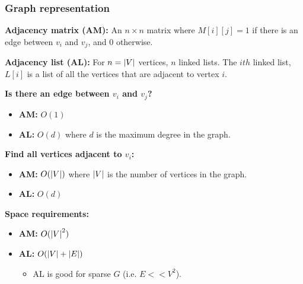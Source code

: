     \subsubsection{Graph representation}
    \begin{definition}
        
        \textbf{Adjacency matrix (AM):} An $n\times n$ matrix where $M[i][j]=1$ if there is an edge between $v_i$ and $v_j$, and $0$ otherwise.
        \vspace{1em}

        \textbf{Adjacency list (AL):} For $n=\abs{V}$ vertices, $n$ linked lists. The $ith$ linked list, $L[i]$ is a list of all the vertices that are adjacent to vertex $i$.
        \vspace{1em}

        \textbf{Is there an edge between $v_i$ and $v_j$?}
        \begin{itemize}
            \item \textbf{AM:} $O(1)$
            \item \textbf{AL:} $O(d)$ where $d$ is the maximum degree in the graph.
        \end{itemize}
        \vspace{1em}

        \textbf{Find all vertices adjacent to $v_i$:}
        \begin{itemize}
            \item \textbf{AM:} $O(\abs{V})$ where $\abs{V}$ is the number of vertices in the graph.
            \item \textbf{AL:} $O(d)$ 
        \end{itemize}
        \vspace{1em}

        \textbf{Space requirements:}
        \begin{itemize}
            \item \textbf{AM:} $O(\abs{V}^2)$
            \item \textbf{AL:} $O(\abs{V}+\abs{E})$
            \begin{itemize}
                \item AL is good for sparse $G$ (i.e. $E<<V^2$).
            \end{itemize}
        \end{itemize}
    \end{definition}


